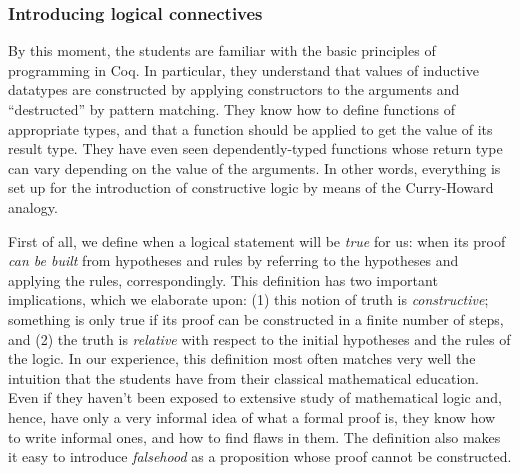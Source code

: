 \documentclass[blockstyle,preprint,nocopyrightspace]{sigplanconf}
\newcommand{\an}[1]{\textcolor{red}{(Aleks: {#1})}}
\begin{document}
\subsubsection{Introducing logical connectives}
\label{sec:intr-logic-conn}

By this moment, the students are familiar with the basic principles of
programming in Coq. In particular, they understand that values of
inductive datatypes are constructed by applying constructors to the
arguments and ``destructed'' by pattern matching. They know how to
define functions of appropriate types, and that a function should be
applied to get the value of its result type. They have even seen
dependently-typed functions whose return type can vary depending on
the value of the arguments. In other words, everything is set up for
the introduction of constructive logic by means of the Curry-Howard
analogy.

First of all, we define when a logical statement will be \emph{true}
for us: when its proof \emph{can be built} from hypotheses and rules
by referring to the hypotheses and applying the rules,
correspondingly. This definition has two important implications, which
we elaborate upon: (1) this notion of truth is \emph{constructive};
something is only true if its proof can be constructed in a finite
number of steps, and (2) the truth is \emph{relative} with respect to
the initial hypotheses and the rules of the logic. In our experience,
this definition most often matches very well the intuition that the
students have from their classical mathematical education. Even if
they haven't been exposed to extensive study of mathematical logic
and, hence, have only a very informal idea of what a formal proof is,
they know how to write informal ones, and how to find flaws in
them. The definition also makes it easy to introduce \emph{falsehood}
as a proposition whose proof cannot be constructed.

\end{document}
